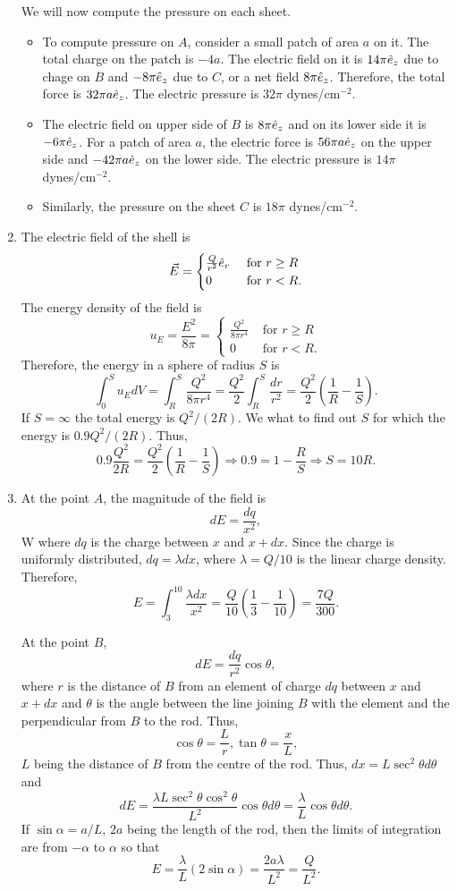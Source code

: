 \documentclass{article}
\begin{document}
\begin{enumerate}
We will now compute the pressure on each sheet.
\begin{itemize}
\item To compute pressure on $A$, consider a small patch of area $a$ on it. The 
total charge on the patch is $-4a$. The electric field on it is $14\pi\hat{e}_{z}$
due to chage on $B$ and $-8\pi\hat{e}_{z}$ due to $C$, or a net field $8\pi\hat{e}_{z}$.
Therefore, the total force is $32\pi a\hat{e}_{z}$. The electric pressure is $32\pi$
dynes/cm$^{-2}$.
\item The electric field on upper side of $B$ is $8\pi\hat{e}_{z}$ and on its lower 
side it is $-6\pi\hat{e}_{z}$. For a patch of area $a$, the electric force is $56\pi a
\hat{e}_{z}$ on the upper side and $-42\pi a\hat{e}_{z}$ on the lower side. The electric
pressure is $14\pi$ dynes/cm$^{-2}$.
\item Similarly, the pressure on the sheet $C$ is $18\pi$ dynes/cm$^{-2}$.
\end{itemize}

\item The electric field of the shell is
\[
\vec{E} = \begin{cases}
\frac{Q}{r^2}\hat{e}_{r} & \text{ for } r \ge R \\
0 & \text{ for } r < R.
\end{cases}
\]
The energy density of the field is 
\[
u_E = \frac{E^2}{8\pi} = \begin{cases} \frac{Q^2}{8\pi r^4} & \text{ for } r \ge R \\
0 & \text{ for } r < R.
\end{cases}
\]
Therefore, the energy in a sphere of radius $S$ is
\[
\int_0^S u_EdV = \int_R^S \frac{Q^2}{8\pi r^4} = \frac{Q^2}{2}\int_R^S\frac{dr}{r^2}
= \frac{Q^2}{2}\left(\frac{1}{R} - \frac{1}{S}\right).
\]
If $S = \infty$ the total energy is $Q^2/(2R)$. We what to find out $S$ for 
which the energy is $0.9Q^2/(2R)$. Thus,
\[
0.9\frac{Q^2}{2R} = \frac{Q^2}{2}\left(\frac{1}{R} - \frac{1}{S}\right)
\Rightarrow 0.9 = 1 - \frac{R}{S} \Rightarrow S = 10R.
\]

\item At the point $A$, the magnitude of the field is
\[
dE = \frac{dq}{x^2},
\] W
where $dq$ is the charge between $x$ and $x + dx$. Since the charge is uniformly
distributed, $dq = \lambda dx$, where $\lambda = Q/10$ is the linear charge density.
Therefore,
\[
E = \int_3^{10}\frac{\lambda dx}{x^2} = \frac{Q}{10}\left(\frac{1}{3} - \frac{1}{10}\right)
= \frac{7Q}{300}.
\]

At the point $B$,
\[
dE = \frac{dq}{r^2}\cos\theta,
\]
where $r$ is the distance of $B$ from an element of charge $dq$ between $x$ and
$x + dx$ and $\theta$ is the angle between the line joining $B$ with the element
and the perpendicular from $B$ to the rod. Thus,
\[
\cos\theta = \frac{L}{r}, \tan\theta = \frac{x}{L},
\]
$L$ being the distance of $B$ from the centre of the rod. Thus, $dx = L\sec^2\theta
d\theta$ and
\[
dE = \frac{\lambda L \sec^2\theta \cos^2\theta}{L^2}\cos\theta d\theta =
\frac{\lambda}{L}\cos\theta d\theta.
\]
If $\sin\alpha = a/L$, $2a$ being the length of the rod, then the limits of 
integration are from $-\alpha$ to $\alpha$ so that
\[
E = \frac{\lambda}{L}(2\sin\alpha) = \frac{2a\lambda}{L^2} = \frac{Q}{L^2}.
\]


\end{enumerate}
\end{document}
